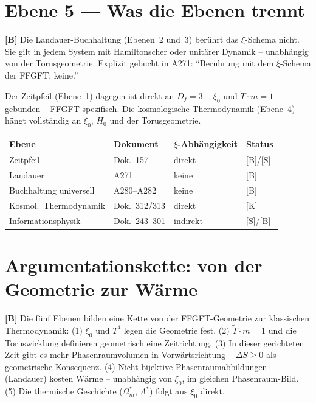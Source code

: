 \section{Ebene 5 --- Was die Ebenen trennt}

\textbf{[B]} Die Landauer-Buchhaltung (Ebenen~2 und~3) berührt das
$\xi$-Schema nicht. Sie gilt in jedem System mit Hamiltonscher oder
unitärer Dynamik – unabhängig von der Torusgeometrie. Explizit
gebucht in A271: \enquote{Berührung mit dem $\xi$-Schema der FFGFT:
	keine.}

Der Zeitpfeil (Ebene~1) dagegen ist direkt an $D_f = 3-\xi_0$ und
$\tilde{T} \cdot m = 1$ gebunden – FFGFT-spezifisch.
Die kosmologische Thermodynamik (Ebene~4) hängt vollständig an
$\xi_0$, $H_0$ und der Torusgeometrie.

\begin{center}
	\small
	\begin{tabular}{@{}p{}p{}p{}p{}@{}}
		\toprule
		\textbf{Ebene} & \textbf{Dokument} & \textbf{$\xi$-Abhängigkeit} & \textbf{Status} \\
		\midrule
		Zeitpfeil & Dok.~157 & direkt & [B]/[S] \\
		Landauer & A271 & keine & [B] \\
		Buchhaltung universell & A280--A282 & keine & [B] \\
		Kosmol.\ Thermodynamik & Dok.~312/313 & direkt & [K] \\
		Informationsphysik & Dok.~243--301 & indirekt & [S]/[B] \\
		\bottomrule
	\end{tabular}
\end{center}

\section{Argumentationskette: von der Geometrie zur Wärme}

\textbf{[B]} Die fünf Ebenen bilden eine Kette von der FFGFT-Geometrie
zur klassischen Thermodynamik:
(1) $\xi_0$ und $T^4$ legen die Geometrie fest.
(2) $\tilde{T} \cdot m = 1$ und die Toruswicklung definieren
geometrisch eine Zeitrichtung.
(3) In dieser gerichteten Zeit gibt es mehr Phasenraumvolumen in
Vorwärtsrichtung – $\Delta S \ge 0$ als geometrische Konsequenz.
(4) Nicht-bijektive Phasenraumabbildungen (Landauer) kosten Wärme –
unabhängig von $\xi_0$, im gleichen Phasenraum-Bild.
(5) Die thermische Geschichte ($\Omega_m^*$, $\Lambda^*$) folgt aus
$\xi_0$ direkt.

